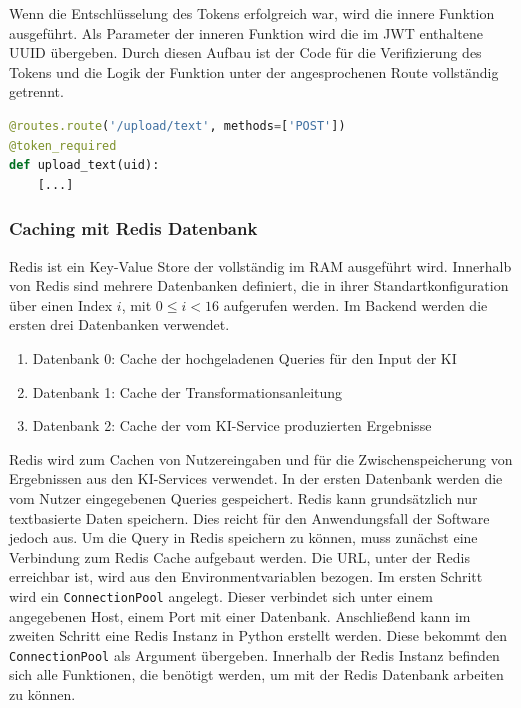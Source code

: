 Wenn die Entschlüsselung des Tokens erfolgreich war, wird die innere Funktion ausgeführt. Als Parameter der inneren Funktion wird die im JWT enthaltene UUID übergeben. Durch diesen Aufbau ist der Code für die Verifizierung des Tokens und die Logik der Funktion unter der angesprochenen Route vollständig getrennt.

\begin{lstlisting}[language=Python, caption={Route zum Upload von Queries mit Nutzung des JWTs}]
@routes.route('/upload/text', methods=['POST'])
@token_required
def upload_text(uid):
    [...]
\end{lstlisting}

\subsubsection{Caching mit Redis Datenbank}
Redis ist ein Key-Value Store der vollständig im RAM ausgeführt wird. Innerhalb von Redis sind mehrere Datenbanken definiert, die in ihrer Standartkonfiguration über einen Index $i$, mit $0\leq{}i<16$ aufgerufen werden. Im Backend werden die ersten drei Datenbanken verwendet.
\begin{enumerate}
 \item Datenbank 0: Cache der hochgeladenen Queries für den Input der KI
 \item Datenbank 1: Cache der Transformationsanleitung
 \item Datenbank 2: Cache der vom KI-Service produzierten Ergebnisse
\end{enumerate} 

Redis wird zum Cachen von Nutzereingaben und für die Zwischenspeicherung von Ergebnissen aus den KI-Services verwendet. In der ersten Datenbank werden die vom Nutzer eingegebenen Queries gespeichert. Redis kann grundsätzlich nur textbasierte Daten speichern. Dies reicht für den Anwendungsfall der Software jedoch aus. Um die Query in Redis speichern zu können, muss zunächst eine Verbindung zum Redis Cache aufgebaut werden. Die URL, unter der Redis erreichbar ist, wird aus den Environmentvariablen bezogen. Im ersten Schritt wird ein \texttt{ConnectionPool} angelegt. Dieser verbindet sich unter einem angegebenen Host, einem Port mit einer Datenbank. Anschließend kann im zweiten Schritt eine Redis Instanz in Python erstellt werden. Diese bekommt den \texttt{ConnectionPool} als Argument übergeben. Innerhalb der Redis Instanz befinden sich alle Funktionen, die benötigt werden, um mit der Redis Datenbank arbeiten zu können.

